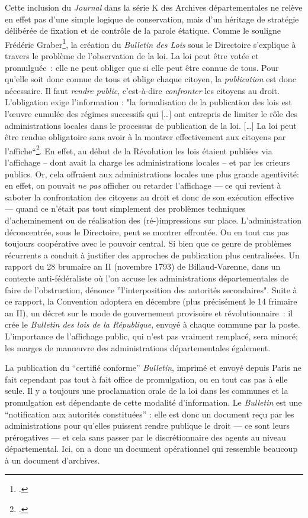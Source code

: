 Cette inclusion du \emph{Journal} dans la série K des Archives départementales ne relève en effet pas d’une simple logique de conservation, mais d’un héritage de stratégie délibérée de fixation et de contrôle de la parole étatique. Comme le souligne Frédéric Graber\footcite[][]{graber}, la création du \emph{Bulletin des Lois} sous le Directoire s'explique à travers le problème de l'observation de la loi. La loi peut être votée et promulguée : elle ne peut obliger que si elle peut être connue de tous. Pour qu’elle soit donc connue de tous et oblige chaque citoyen, la \emph{publication} est donc nécessaire. Il faut \emph{rendre public}, c’est-à-dire \emph{confronter} les citoyens au droit. L’obligation exige l’information : "la formalisation de la publication des lois est l’œuvre cumulée des régimes successifs qui […] ont entrepris de limiter le rôle des 
administrations locales dans le processus de publication de la loi. […] La loi peut être rendue obligatoire sans avoir à la montrer effectivement aux citoyens par l’affiche\enquote{\footcite[][]{graber}. En effet, au début de la Révolution les lois étaient publiées via l’affichage -- dont avait la charge les administrations locales -- et par les crieurs publics. Or, cela  offraient aux administrations locales une plus grande agentivité: en  effet, on pouvait \emph{ne pas} afficher ou retarder l’affichage — ce  qui revient à saboter la confrontation des citoyens au droit et donc de son exécution effective — quand ce n’était pas tout simplement des problèmes techniques d’acheminement ou de réalisation des (ré-)impressions sur place. L’administration déconcentrée, sous le Directoire, peut se montrer effrontée. Ou en tout cas pas  toujours coopérative avec le pouvoir central. Si bien que ce genre de problèmes récurrents a conduit à justifier des approches de publication plus centralisées. Un rapport du 28 brumaire an II (novembre 1793) de Billaud-Varenne, dans un contexte anti-fédéraliste où l’on accuse les administrations  départementales de faire de l’obstruction, dénonce }l’interposition des  autorités secondaires". Suite à ce rapport, la Convention adoptera en décembre (plus précisément le 14 frimaire an II), un décret sur le mode de gouvernement provisoire et révolutionnaire : il crée le \emph{Bulletin des lois de la République}, envoyé à chaque commune par la poste. L’importance de l’affichage public, qui n’est pas vraiment remplacé, sera minoré; les marges de manœuvre des administrations départementales également.

La publication du \enquote{certifié conforme} \emph{Bulletin}, imprimé et envoyé depuis Paris ne fait cependant pas tout à fait office de promulgation, ou en tout cas pas à elle seule. Il y a toujours une proclamation orale de la loi dans les communes et la promulgation est dépendante de cette modalité d’information. Le \emph{Bulletin} est une \enquote{notification aux autorités constituées} : elle est donc un document reçu par les administrations pour qu’elles puissent rendre publique le droit — ce sont leurs  prérogatives — et cela sans passer par le discrétionnaire des agents au  niveau départemental. Ici, on a donc un document opérationnel qui ressemble beaucoup à un document d’archives.

